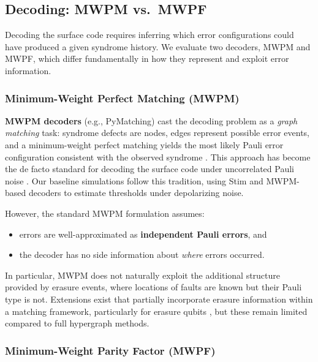 \documentclass[11pt, notitlepage, letterpaper]{article}
\begin{document}
\subsection{Decoding: MWPM vs.\ MWPF}
\label{subsec:decoding}

Decoding the surface code requires inferring which error configurations could have produced a given syndrome history. We evaluate two decoders, MWPM and MWPF, which differ fundamentally in how they represent and exploit error information.

\subsubsection{Minimum-Weight Perfect Matching (MWPM)}

\textbf{MWPM decoders} (e.g., PyMatching) cast the decoding problem as a \emph{graph matching} task: syndrome defects are nodes, edges represent possible error events, and a minimum-weight perfect matching yields the most likely Pauli error configuration consistent with the observed syndrome \cite{oscarhiggott_oscarhiggottpymatching_2025}\cite{higgott_sparse_2025}. This approach has become the de facto standard for decoding the surface code under uncorrelated Pauli noise \cite{fowler_surface_2012}\cite{fowler_optimal_2013}. Our baseline simulations follow this tradition, using Stim and MWPM-based decoders to estimate thresholds under depolarizing noise.

However, the standard MWPM formulation assumes:
\begin{itemize}
    \item errors are well-approximated as \textbf{independent Pauli errors}, and
    \item the decoder has no side information about \emph{where} errors occurred.
\end{itemize}

In particular, MWPM does not naturally exploit the additional structure provided by erasure events, where locations of faults are known but their Pauli type is not. Extensions exist that partially incorporate erasure information within a matching framework, particularly for erasure qubits \cite{kubica_erasure_2023}\cite{gu_fault-tolerant_2025}, but these remain limited compared to full hypergraph methods.

\subsubsection{Minimum-Weight Parity Factor (MWPF)}
\end{document}
